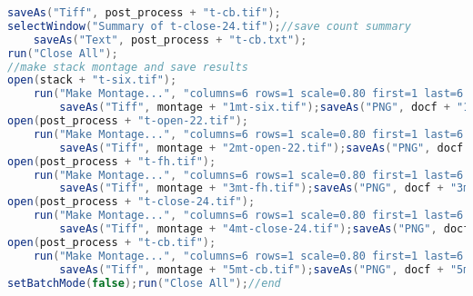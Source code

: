 \begin{lstlisting}[language=java, caption=Thresholding by six common methods., label=cd:threshold-six-post]
		saveAs("Tiff", post_process + "t-cb.tif");
selectWindow("Summary of t-close-24.tif");//save count summary
	saveAs("Text", post_process + "t-cb.txt");
run("Close All");
//make stack montage and save results
open(stack + "t-six.tif");
	run("Make Montage...", "columns=6 rows=1 scale=0.80 first=1 last=6 increment=1 border=4 font=20 label");
		saveAs("Tiff", montage + "1mt-six.tif");saveAs("PNG", docf + "1mt.png");
open(post_process + "t-open-22.tif");
	run("Make Montage...", "columns=6 rows=1 scale=0.80 first=1 last=6 increment=1 border=4 font=20 label");
		saveAs("Tiff", montage + "2mt-open-22.tif");saveAs("PNG", docf + "2mt.png");
open(post_process + "t-fh.tif"); 
	run("Make Montage...", "columns=6 rows=1 scale=0.80 first=1 last=6 increment=1 border=4 font=20 label");
		saveAs("Tiff", montage + "3mt-fh.tif");saveAs("PNG", docf + "3mt.png");
open(post_process + "t-close-24.tif"); 
	run("Make Montage...", "columns=6 rows=1 scale=0.80 first=1 last=6 increment=1 border=4 font=20 label");
		saveAs("Tiff", montage + "4mt-close-24.tif");saveAs("PNG", docf + "4mt.png");
open(post_process + "t-cb.tif"); 
	run("Make Montage...", "columns=6 rows=1 scale=0.80 first=1 last=6 increment=1 border=4 font=20 label");
		saveAs("Tiff", montage + "5mt-cb.tif");saveAs("PNG", docf + "5mt.png");
setBatchMode(false);run("Close All");//end
\end{lstlisting}

